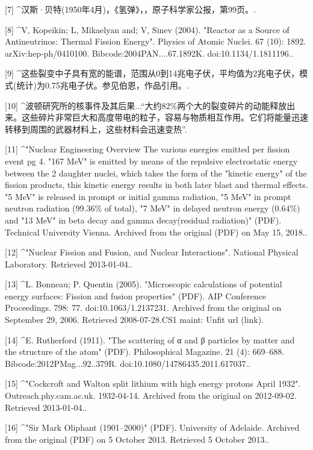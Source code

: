[7]
^汉斯·贝特(1950年4月)，《氢弹》，，原子科学家公报，第99页。.

[8]
^V, Kopeikin; L, Mikaelyan and; V, Sinev (2004). "Reactor as a Source of Antineutrinos: Thermal Fission Energy". Physics of Atomic Nuclei. 67 (10): 1892. arXiv:hep-ph/0410100. Bibcode:2004PAN....67.1892K. doi:10.1134/1.1811196..


[9]
^这些裂变中子具有宽的能谱，范围从0到14兆电子伏，平均值为2兆电子伏，模式(统计)为0.75兆电子伏。参见伯恩，作品引用。.

[10]
^波顿研究所的核事件及其后果...“大约82\%两个大的裂变碎片的动能释放出来。这些碎片非常巨大和高度带电的粒子，容易与物质相互作用。它们将能量迅速转移到周围的武器材料上，这些材料会迅速变热”.

[11]
^"Nuclear Engineering Overview The various energies emitted per fission event pg 4. "167 MeV" is emitted by means of the repulsive electrostatic energy between the 2 daughter nuclei, which takes the form of the "kinetic energy" of the fission products, this kinetic energy results in both later blast and thermal effects. "5 MeV" is released in prompt or initial gamma radiation, "5 MeV" in prompt neutron radiation (99.36\% of total), "7 MeV" in delayed neutron energy (0.64\%) and "13 MeV" in beta decay and gamma decay(residual radiation)" (PDF). Technical University Vienna. Archived from the original (PDF) on May 15, 2018..

[12]
^"Nuclear Fission and Fusion, and Nuclear Interactions". National Physical Laboratory. Retrieved 2013-01-04..

[13]
^L. Bonneau; P. Quentin (2005). "Microscopic calculations of potential energy surfaces: Fission and fusion properties" (PDF). AIP Conference Proceedings. 798: 77. doi:10.1063/1.2137231. Archived from the original on September 29, 2006. Retrieved 2008-07-28.CS1 maint: Unfit url (link).

[14]
^E. Rutherford (1911). "The scattering of α and β particles by matter and the structure of the atom" (PDF). Philosophical Magazine. 21 (4): 669–688. Bibcode:2012PMag...92..379R. doi:10.1080/14786435.2011.617037..

[15]
^"Cockcroft and Walton split lithium with high energy protons April 1932". Outreach.phy.cam.ac.uk. 1932-04-14. Archived from the original on 2012-09-02. Retrieved 2013-01-04..

[16]
^"Sir Mark Oliphant (1901–2000)" (PDF). University of Adelaide. Archived from the original (PDF) on 5 October 2013. Retrieved 5 October 2013..

